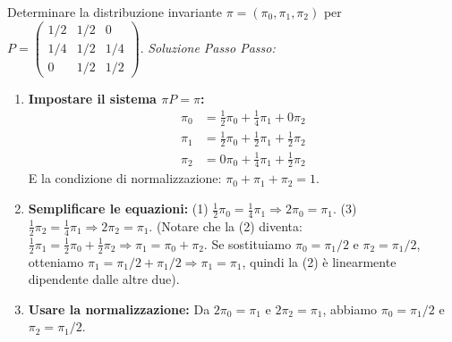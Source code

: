 \documentclass[12pt,a4paper]{article}
\begin{document}

\begin{example}
Determinare la distribuzione invariante $\pi = (\pi_0, \pi_1, \pi_2)$ per $P = \begin{pmatrix} 1/2 & 1/2 & 0 \\ 1/4 & 1/2 & 1/4 \\ 0 & 1/2 & 1/2 \end{pmatrix}$.
\textit{Soluzione Passo Passo:}
\begin{enumerate}
    \item \textbf{Impostare il sistema $\pi P = \pi$:}
    \begin{align*}
        \pi_0 &= \frac{1}{2}\pi_0 + \frac{1}{4}\pi_1 + 0\pi_2 \\
        \pi_1 &= \frac{1}{2}\pi_0 + \frac{1}{2}\pi_1 + \frac{1}{2}\pi_2 \\
        \pi_2 &= 0\pi_0 + \frac{1}{4}\pi_1 + \frac{1}{2}\pi_2
    \end{align*}
    E la condizione di normalizzazione: $\pi_0 + \pi_1 + \pi_2 = 1$.
    \item \textbf{Semplificare le equazioni:}
    (1) $\frac{1}{2}\pi_0 = \frac{1}{4}\pi_1 \Rightarrow 2\pi_0 = \pi_1$.
    (3) $\frac{1}{2}\pi_2 = \frac{1}{4}\pi_1 \Rightarrow 2\pi_2 = \pi_1$.
    (Notare che la (2) diventa: $\frac{1}{2}\pi_1 = \frac{1}{2}\pi_0 + \frac{1}{2}\pi_2 \Rightarrow \pi_1 = \pi_0 + \pi_2$. Se sostituiamo $\pi_0=\pi_1/2$ e $\pi_2=\pi_1/2$, otteniamo $\pi_1 = \pi_1/2 + \pi_1/2 \Rightarrow \pi_1=\pi_1$, quindi la (2) è linearmente dipendente dalle altre due).
    \item \textbf{Usare la normalizzazione:}
    Da $2\pi_0 = \pi_1$ e $2\pi_2 = \pi_1$, abbiamo $\pi_0 = \pi_1/2$ e $\pi_2 = \pi_1/2$.

\end{enumerate}
\end{example}
\end{document}
